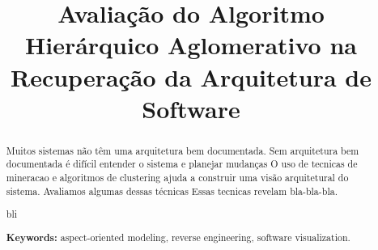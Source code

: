 \documentclass[a4]{article}
\title{Avaliação do Algoritmo Hierárquico Aglomerativo na Recuperação da Arquitetura de Software}
\begin{document}
\maketitle

\begin{abstract}

  Muitos sistemas não têm uma arquitetura bem documentada.
  Sem arquitetura bem documentada é difícil entender o sistema e planejar mudanças
  O uso de tecnicas de mineracao e algoritmos de clustering ajuda a construir uma visão arquitetural do sistema.
    Avaliamos algumas dessas técnicas
  Essas tecnicas revelam bla-bla-bla.
  

bli~\cite{Maqbool2007}

\textbf{Keywords:} 
aspect-oriented modeling,
reverse engineering,
software visualization.
\end{abstract}






%

%
%
%






\end{document}
